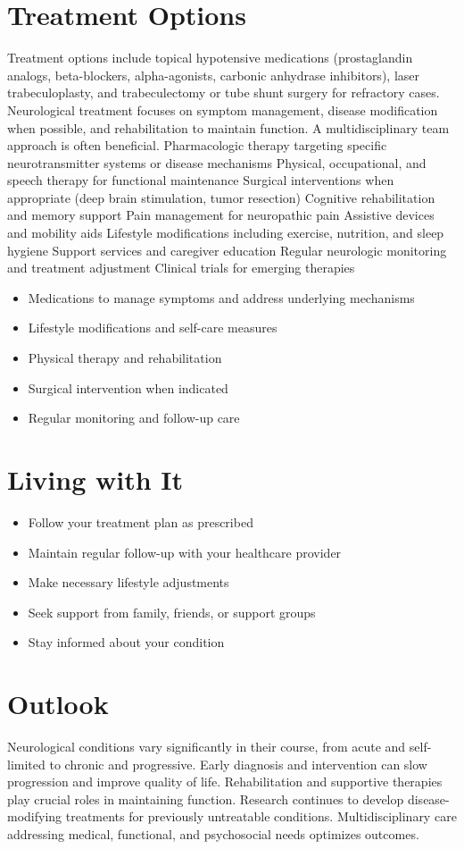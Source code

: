 \section{Treatment Options}
Treatment options include topical hypotensive medications (prostaglandin analogs, beta-blockers, alpha-agonists, carbonic anhydrase inhibitors), laser trabeculoplasty, and trabeculectomy or tube shunt surgery for refractory cases. Neurological treatment focuses on symptom management, disease modification when possible, and rehabilitation to maintain function. A multidisciplinary team approach is often beneficial. Pharmacologic therapy targeting specific neurotransmitter systems or disease mechanisms Physical, occupational, and speech therapy for functional maintenance Surgical interventions when appropriate (deep brain stimulation, tumor resection) Cognitive rehabilitation and memory support Pain management for neuropathic pain Assistive devices and mobility aids Lifestyle modifications including exercise, nutrition, and sleep hygiene Support services and caregiver education Regular neurologic monitoring and treatment adjustment Clinical trials for emerging therapies

\begin{itemize}[noitemsep]
  \item Medications to manage symptoms and address underlying mechanisms
  \item Lifestyle modifications and self-care measures
  \item Physical therapy and rehabilitation
  \item Surgical intervention when indicated
  \item Regular monitoring and follow-up care
\end{itemize}
\section{Living with It}
\begin{itemize}[noitemsep]
  \item Follow your treatment plan as prescribed
  \item Maintain regular follow-up with your healthcare provider
  \item Make necessary lifestyle adjustments
  \item Seek support from family, friends, or support groups
  \item Stay informed about your condition
\end{itemize}
\section{Outlook}
Neurological conditions vary significantly in their course, from acute and self-limited to chronic and progressive. Early diagnosis and intervention can slow progression and improve quality of life. Rehabilitation and supportive therapies play crucial roles in maintaining function. Research continues to develop disease-modifying treatments for previously untreatable conditions. Multidisciplinary care addressing medical, functional, and psychosocial needs optimizes outcomes.
